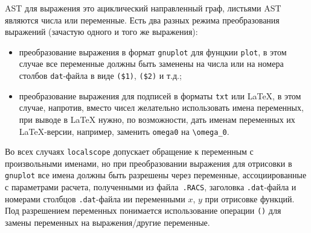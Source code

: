 \documentclass[12pt]{article}
\def\gnuplot{{\tt gnuplot}}
\begin{document}
AST для выражения это ациклический направленный граф, листьями AST являются числа или переменные. 
Есть два разных режима преобразования выражений (зачастую одного и того же выражения):
\begin{itemize}
\item преобразование выражения в формат \gnuplot{} для фунцкии \verb'plot',  в этом случае все переменные должны быть заменены на числа
  или на номера столбов \verb'dat'-файла  в виде \verb'($1)', \verb'($2)' и т.д.;
\item преобразование выражения для подписей в форматы \verb'txt' или \LaTeX{}, в этом случае, напротив, вместо чисел желательно использовать имена переменных,
 при выводе в \LaTeX{} нужно, по возможности, дать именам переменных их \LaTeX-версии, например, заменить \verb'omega0' на \verb'\omega_0'.
\end{itemize}
Во всех случаях \verb'localscope' допускает обращение к переменным с произвольными именами, но при преобразовании выражения
для отрисовки в \gnuplot{} все имена должны быть разрешены через переменные, ассоциированные с параметрами расчета, полученными из файла~\verb'.RACS',
заголовка \verb'.dat'-файла и номерами столбцов \verb'.dat'-файла ии переменными $x$, $y$ при отрисовке функций.
Под разрешением переменных понимается использование операции \verb'()' для замены переменных на выражения/другие переменные. 
\end{document}

